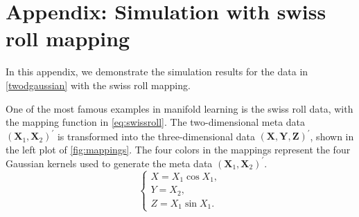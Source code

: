 \documentclass[11pt,a4paper,]{article}
\begin{document}
\hypertarget{swissrollappe}{%
\section{Appendix: Simulation with swiss roll mapping}\label{swissrollappe}}

In this appendix, we demonstrate the simulation results for the data in \autoref{twodgaussian} with the swiss roll mapping.

One of the most famous examples in manifold learning is the swiss roll data, with the mapping function in \eqref{eq:swissroll}. The two-dimensional meta data \((\pmb{X}_1, \pmb{X}_2)^\prime\) is transformed into the three-dimensional data \((\pmb{X}, \pmb{Y}, \pmb{Z})^\prime\), shown in the left plot of \autoref{fig:mappings}. The four colors in the mappings represent the four Gaussian kernels used to generate the meta data \((\pmb{X}_1, \pmb{X}_2)^\prime\).
\begin{equation}
\label{eq:swissroll}
\left\{
\begin{array}{lcl}
X = X_1 \cos{X_1}, \\
Y = X_2, \\
Z = X_1 \sin{X_1}.
\end{array}
\right.
\end{equation}
\end{document}
